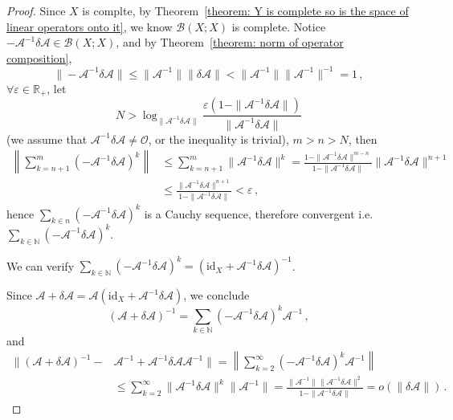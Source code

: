 \documentclass[openany]{book}
\theoremstyle{plain}
\theoremstyle{definition}
\newcommand*{\id}{\mathrm{id}} %
\begin{document}
\begin{proof}
	Since $X$ is complte, by Theorem~\ref{theorem: Y is complete so is the space of linear operators onto it}, we know $\mathcal B(X; X)$ is complete.
	Notice $ - \mathscr A^{-1} \delta \mathscr A \in \mathcal B(X; X)$, and by Theorem~\ref{theorem: norm of operator composition},
	\begin{equation*}
		\| -\mathscr A^{-1} \delta \mathscr A\| 
		\leq \|\mathscr A^{-1}\| \|\delta \mathscr A\| 
		< \|\mathscr A^{-1}\| \|\mathscr A^{-1}\|^{-1} = 1\,,
	\end{equation*} 
	$\forall \varepsilon \in \mathbb R_+$, let
	\begin{equation*}
		N > \log_{\|\mathscr A^{-1} \delta \mathscr A\|} 
		\frac{\varepsilon (1 - \|\mathscr A^{-1} \delta \mathscr A\|)}{\|\mathscr A^{-1} \delta \mathscr A\|}
	\end{equation*}
	(we assume that $\mathscr A^{-1} \delta \mathscr A \neq \mathscr O$, or the inequality is trivial), $m > n > N$, then
	\begin{align*}
		\left\|
			\sum_{k = n + 1}^{m}(-\mathscr A^{-1} \delta \mathscr A )^k
		\right\| 
			&\leq \sum_{k = n + 1}^{m} \|\mathscr A^{-1} \delta \mathscr A \|^k
			= \frac{1 - \|\mathscr A^{-1} \delta \mathscr A\|^{m - n}}{1 - \|\mathscr A^{-1} \delta \mathscr A\|} \|\mathscr A^{-1} \delta \mathscr A\|^{n + 1}
			\\
			&\leq \frac{\|\mathscr A^{-1} \delta \mathscr A\|^{n + 1}}{1 - \|\mathscr A^{-1} \delta \mathscr A\|} < \varepsilon\,,
	\end{align*}
	hence $\sum_{k \in n} (- \mathscr A^{-1} \delta \mathscr A)^k$ is a Cauchy sequence, therefore convergent i.e. $\sum_{k \in \mathbb N} (- \mathscr A^{-1} \delta \mathscr A)^k$.

	We can verify $\sum_{k \in \mathbb N} (- \mathscr A^{-1} \delta \mathscr A)^k = (\id_X + \mathscr A^{-1} \delta \mathscr A)^{-1}$.

	Since $\mathscr A + \delta \mathscr A = \mathscr A (\id_X + \mathscr A^{-1} \delta \mathscr A)$, we conclude
	\begin{equation*}
		(\mathscr A + \delta \mathscr A)^{-1} 
		= \sum_{k \in \mathbb N} (- \mathscr A^{-1} \delta \mathscr A)^k \mathscr A^{-1}\,,
	\end{equation*}
	and
	\begin{align*}
		\|(\mathscr A + \delta \mathscr A)^{-1} -& \mathscr A^{-1} + \mathscr A^{-1} \delta \mathscr A \mathscr A^{-1}\| 
		= \left\|
			\sum_{k = 2}^{\infty} (- \mathscr A^{-1} \delta \mathscr A)^k \mathscr A^{-1}
		\right\| 
		\\
		&\leq
		\sum_{k = 2}^{\infty} \|\mathscr A^{-1} \delta \mathscr A\|^k \|\mathscr A^{-1}\| 
		= \frac{\|\mathscr A^{-1}\| \|\mathscr A^{-1} \delta \mathscr A\|^2}{1 - \|\mathscr A^{-1} \delta \mathscr A\|}
		= o(\|\delta \mathscr A\|)\,.
	\end{align*}
\end{proof}
\end{document}
